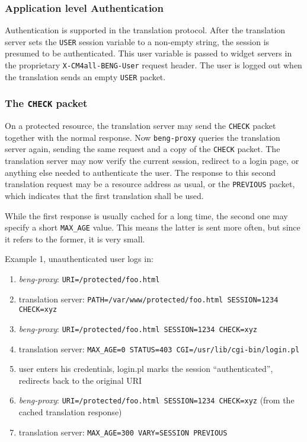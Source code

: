 \documentclass[a4paper,12pt]{article}
\begin{document}
\subsubsection{Application level Authentication}

Authentication is supported in the translation protocol.  After the
translation server sets the \verb|USER| session variable to a
non-empty string, the session is presumed to be authenticated.  This
user variable is passed to widget servers in the proprietary
\texttt{X-CM4all-BENG-User} request header.  The user is logged out
when the translation sends an empty \verb|USER| packet.

\subsubsection{The \texttt{CHECK} packet}

On a protected resource, the translation server may send the
\verb|CHECK| packet together with the normal response.  Now
\texttt{beng-proxy} queries the translation server again, sending the
same request and a copy of the \verb|CHECK| packet.  The translation
server may now verify the current session, redirect to a login page,
or anything else needed to authenticate the user.  The response to
this second translation request may be a resource address as usual, or
the \verb|PREVIOUS| packet, which indicates that the first
translation shall be used.

While the first response is usually cached for a long time, the second
one may specify a short \texttt{MAX\_AGE} value.  This means the latter
is sent more often, but since it refers to the former, it is very
small.

Example 1, unauthenticated user logs in:

\begin{enumerate}
\item \emph{beng-proxy}: \texttt{URI=/protected/foo.html}
\item translation server: \texttt{PATH=/var/www/protected/foo.html
  SESSION=1234 CHECK=xyz}
\item \emph{beng-proxy}: \texttt{URI=/protected/foo.html SESSION=1234
  CHECK=xyz}
\item translation server: \texttt{MAX\_AGE=0 STATUS=403
  CGI=/usr/lib/cgi-bin/login.pl}
\item user enters his credentials, login.pl marks the session
  ``authenticated'', redirects back to the original URI
\item \emph{beng-proxy}: \texttt{URI=/protected/foo.html SESSION=1234
  CHECK=xyz} (from the cached translation response)
\item translation server: \texttt{MAX\_AGE=300 VARY=SESSION PREVIOUS}
\end{enumerate}
\end{document}
